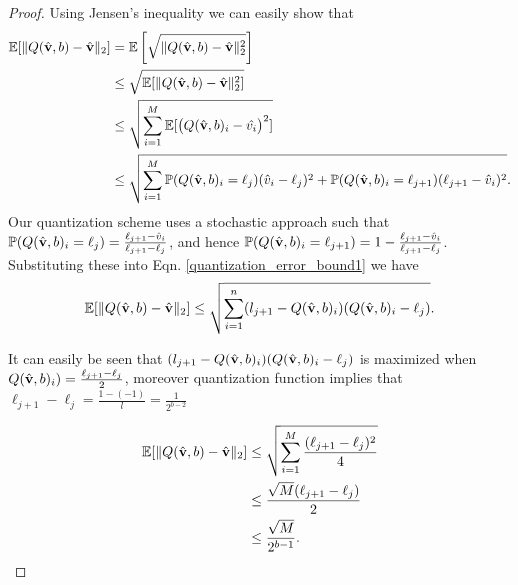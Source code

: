 \documentclass{article}
\newtheorem{proof}{Proof}
\newtheorem{corollary}{Corollary}
\begin{document}
\begin{proof}
Using Jensen's inequality we can easily show that
\begin{equation}\label{quantization_error_bound1}
\begin{split}
    \mathbb{E}[\| Q(\hat{\bf v}, b) - \hat{\bf v}\|_2] &= \mathbb{E}\left[\sqrt{\| Q(\hat{\bf v}, b) - \hat{\bf v}\|^2_2} \right]\\
    &\leq \sqrt{\mathbb{E}[\| Q(\hat{\bf v}, b) - \hat{\bf v}\|^2_2]}\\
    &\leq \sqrt{\sum_{i=1}^{M} \mathbb{E}[\big (Q(\hat{\bf v}, b)_i -\hat{v_i}\big)^2]}\\
    &\leq \sqrt{\sum_{i=1}^{M} \mathbb{P}(Q(\hat{\bf v}, b)_i = \ell_j)(\hat{v}_i-\ell_j)^2 + \mathbb{P}(Q(\hat{\bf v}, b)_i = \ell_{j+1})(\ell_{j+1}-\hat{v}_i)^2}.
\end{split}
\end{equation}
Our quantization scheme uses a stochastic approach such that $\mathbb{P}(Q(\hat{\bf v}, b)_i = \ell_j)=\frac{\ell_{j+1}-\hat{v}_i}{\ell_{j+1}-\ell_{j}}$, and hence $\mathbb{P}(Q(\hat{\bf v}, b)_i = \ell_{j+1})=1-\frac{\ell_{j+1}-\hat{v}_i}{\ell_{j+1}-\ell_{j}}$. Substituting these into Eqn. \ref{quantization_error_bound1} we have
\begin{equation}\label{quantization_error_sub}
\begin{split}
    \mathbb{E}[\| Q(\hat{\bf v}, b) - \hat{\bf v}\|_2] \leq \sqrt{\sum_{i=1}^{n} (l_{j+1}-Q(\hat{\bf v}, b)_i)(Q(\hat{\bf v}, b)_i-\ell_j)}.
\end{split}
\end{equation}

It can easily be seen that $(l_{j+1}-Q(\hat{\bf v}, b)_i)(Q(\hat{\bf v}, b)_i-\ell_j)$ is maximized when $Q(\hat{\bf v}, b)_i) =  \frac{\ell_{j+1}-\ell_j}{2}$, moreover quantization function implies that $\ell_{j+1}-\ell_j = \frac{1-(-1)}{l} = \frac{1}{2^{b-2}}$


\begin{equation}\label{quantization_error}
\begin{split}
    \mathbb{E}[\| Q(\hat{\bf v}, b) - \hat{\bf v}\|_2] &\leq \sqrt{\sum_{i=1}^{M} \frac{(\ell_{j+1}-\ell_j)^2}{4}}\\
    &\leq \frac{\sqrt{M}(\ell_{j+1}-\ell_j)}{2}\\
    &\leq \frac{\sqrt{M}}{2^{b-1}}.
\end{split}
\end{equation}
\end{proof}
\end{document}
